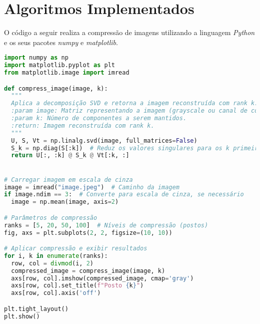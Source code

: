 \chapter{Algoritmos Implementados}

O código a seguir realiza a compressão de imagens utilizando a linguagem {\it Python} e os seus pacotes \textit{numpy} e \textit{matplotlib}.

\vspace{8pt}
\begin{lstlisting}[language=Python, caption={Implementação do algoritmo de compressão de imagens usando SVD.}, label={cod:a1}]
import numpy as np
import matplotlib.pyplot as plt
from matplotlib.image import imread

def compress_image(image, k):
  """
  Aplica a decomposição SVD e retorna a imagem reconstruída com rank k.
  :param image: Matriz representando a imagem (grayscale ou canal de cor).
  :param k: Número de componentes a serem mantidos.
  :return: Imagem reconstruída com rank k.
  """
  U, S, Vt = np.linalg.svd(image, full_matrices=False)
  S_k = np.diag(S[:k])  # Reduz os valores singulares para os k primeiros
  return U[:, :k] @ S_k @ Vt[:k, :]


# Carregar imagem em escala de cinza
image = imread("image.jpeg")  # Caminho da imagem
if image.ndim == 3:  # Converte para escala de cinza, se necessário
  image = np.mean(image, axis=2)

# Parâmetros de compressão
ranks = [5, 20, 50, 100]  # Níveis de compressão (postos)
fig, axs = plt.subplots(2, 2, figsize=(10, 10))

# Aplicar compressão e exibir resultados
for i, k in enumerate(ranks):
  row, col = divmod(i, 2)
  compressed_image = compress_image(image, k)
  axs[row, col].imshow(compressed_image, cmap='gray')
  axs[row, col].set_title(f"Posto {k}")
  axs[row, col].axis('off')

plt.tight_layout()
plt.show()
\end{lstlisting}